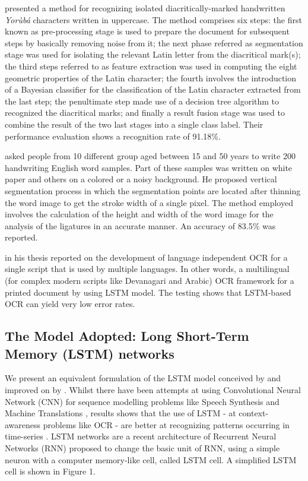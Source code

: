 \documentclass[review]{elsarticle}
\newcommand{\yor}{\textit{Yor\`ub\'a }}
\begin{document}
\cite{ibraheemtowards} presented a method for recognizing isolated diacritically-marked handwritten \yor characters written in uppercase. The method comprises six steps: the first known as pre-processing stage is used to prepare the document for subsequent steps by basically removing noise from it; the next phase referred as segmentation stage was used for isolating the relevant Latin letter from the diacritical mark(s); the third steps referred to as feature extraction was used in computing the eight geometric properties of the Latin character; the fourth involves the introduction of a Bayesian classifier for the classification of the Latin character extracted from the last step; the penultimate step made use of a decision tree algorithm to recognized the diacritical marks; and finally a result fusion stage was used to combine the result of the two last stages into a single class label. Their performance evaluation shows a recognition rate of 91.18\%.

\cite{choudhary2013new} asked people from 10 different group aged between 15 and 50 years to write 200 handwriting English word samples. Part of these samples was written on white paper and others on a colored or a noisy background. He proposed vertical segmentation process in which the segmentation points are located after thinning the word image to get the stroke width of a single pixel.  The method employed involves the calculation of the height and width of the word image for the analysis of the ligatures in an accurate manner. An accuracy of 83.5\% was reported. 


\cite{phdthesisAdnan} in his thesis reported on the development of language independent OCR for a single script that is used by multiple languages. In other words, a multilingual (for complex modern scripts like Devanagari and Arabic) OCR framework for a printed document by using LSTM model. The testing shows that LSTM-based OCR can yield very low error rates. 


\subsection{The Model Adopted: Long Short-Term Memory (LSTM) networks}
We present an equivalent formulation of the LSTM model conceived by \cite{hochreiter1997long} and improved on by \cite{gers2002learning}. Whilst there have been attempts at using Convolutional Neural Network (CNN) for sequence modelling problems like Speech Synthesis and Machine Translations \cite{bai2018empirical}, results shows that the use of LSTM - at context-awareness problems like OCR - are better at recognizing patterns occurring in time-series \cite{senior1994off}. LSTM networks are a recent architecture of Recurrent Neural Networks (RNN) \cite{hochreiter1997long} proposed to change the basic unit of RNN, using a simple neuron with a computer memory-like cell, called LSTM cell. A simplified LSTM cell is shown in Figure 1.
\end{document}
